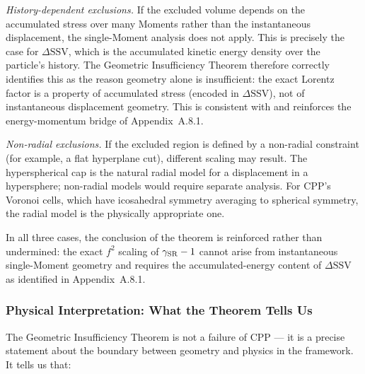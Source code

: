 \documentclass[11pt,letterpaper]{article}
\begin{document}
\textit{History-dependent exclusions.} If the excluded volume depends on the accumulated stress over many Moments rather than 
the instantaneous displacement, the single-Moment analysis does not apply. This is precisely the case for $\Delta\text{SSV}$, which is 
the accumulated kinetic energy density over the particle's history. The Geometric Insufficiency Theorem therefore correctly identifies 
this as the reason geometry alone is insufficient: the exact Lorentz factor is a property of accumulated stress (encoded in 
$\Delta\text{SSV}$), not of instantaneous displacement geometry. This is consistent with and reinforces the energy-momentum bridge 
of Appendix~A.8.1.

\textit{Non-radial exclusions.} If the excluded region is defined by a non-radial constraint (for example, a flat hyperplane cut), 
different scaling may result. The hyperspherical cap is the natural radial model for a displacement in a hypersphere; non-radial models 
would require separate analysis. For CPP's Voronoi cells, which have icosahedral symmetry averaging to spherical symmetry, the radial 
model is the physically appropriate one.

In all three cases, the conclusion of the theorem is reinforced rather than undermined: the exact $f^2$ scaling of $\gamma_{\rm SR}-1$ 
cannot arise from instantaneous single-Moment geometry and requires the accumulated-energy content of $\Delta\text{SSV}$ as identified 
in Appendix~A.8.1.

\subsubsection{Physical Interpretation: What the Theorem Tells Us}

The Geometric Insufficiency Theorem is not a failure of CPP — it is a precise statement about the boundary between geometry and physics in the framework. It tells us that:
\end{document}
